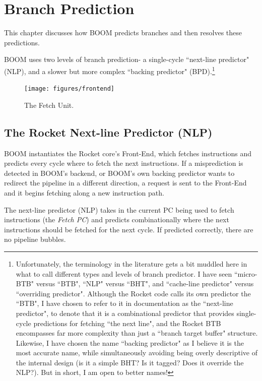  
\chapter{Branch Prediction}\label{chapter:bpd}

This chapter discusses how BOOM predicts branches and then resolves these predictions.

BOOM uses two levels of branch prediction- a single-cycle ``next-line predictor" (NLP), and a slower but more complex ``backing predictor" (BPD).\footnote{Unfortunately, the terminology in the literature gets a bit muddled here in what to call different types and levels of branch predictor. I have seen ``micro-BTB" versus ``BTB", ``NLP" versus ``BHT", and ``cache-line predictor" versus ``overriding predictor". 
Although the Rocket code calls its own predictor the ``BTB", I have chosen to refer to it in documentation as the ``next-line predictor", to denote that it is a combinational predictor that provides single-cycle predictions for fetching ``the next line", and the Rocket BTB encompasses far more complexity than just a ``branch target buffer" structure.  Likewise, I have chosen the name ``backing predictor" as I believe it is the most accurate name, while simultaneously avoiding being overly descriptive of the internal design (is it a simple BHT? Is it tagged? Does it override the NLP?).
{\color{red} But in short, I am open to better names!}}



\begin{figure}[ht]
	\centering
	\centerline{\texttt{[image: figures/frontend]}}
	\caption{ \small The Fetch Unit.}
	\label{fig:fetch}
\end{figure}


\section{The Rocket Next-line Predictor (NLP)}

BOOM instantiates the Rocket core's Front-End, which fetches instructions and predicts every cycle where to fetch the next instructions. If a misprediction is detected in BOOM's backend, or BOOM's own backing predictor wants to redirect the pipeline in a different direction, a request is sent to the Front-End and it begins fetching along a new instruction path. 

The next-line predictor (NLP) takes in the current PC being used to fetch instructions (the {\em Fetch PC}) and predicts combinationally where the next instructions should be fetched for the next cycle. If predicted correctly, there are no pipeline bubbles. 

